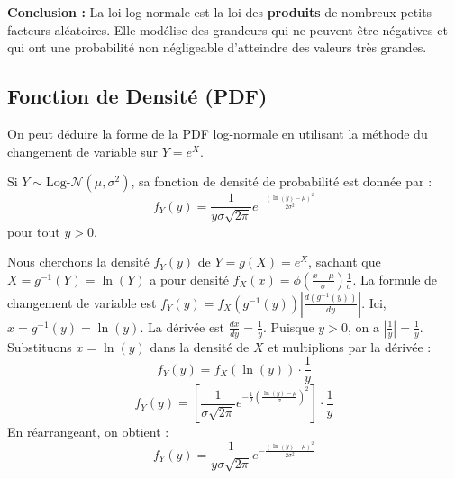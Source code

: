\begin{intuitionbox}
\textbf{Conclusion :} La loi log-normale est la loi des \textbf{produits} de nombreux petits facteurs aléatoires. Elle modélise des grandeurs qui ne peuvent être négatives et qui ont une probabilité non négligeable d'atteindre des valeurs très grandes.
\end{intuitionbox}

\subsection{Fonction de Densité (PDF)}

On peut déduire la forme de la PDF log-normale en utilisant la méthode du changement de variable sur $Y = e^X$.

\begin{theorembox}
Si $Y \sim \text{Log-}\mathcal{N}(\mu, \sigma^2)$, sa fonction de densité de probabilité est donnée par :
$$ f_Y(y) = \frac{1}{y \sigma \sqrt{2\pi}} e^{ -\frac{(\ln(y) - \mu)^2}{2\sigma^2} } $$
pour tout $y > 0$.
\end{theorembox}

\begin{proofbox}
Nous cherchons la densité $f_Y(y)$ de $Y = g(X) = e^X$, sachant que $X = g^{-1}(Y) = \ln(Y)$ a pour densité $f_X(x) = \phi\left(\frac{x-\mu}{\sigma}\right) \frac{1}{\sigma}$.
La formule de changement de variable est $f_Y(y) = f_X(g^{-1}(y)) \left| \frac{d(g^{-1}(y))}{dy} \right|$.
Ici, $x = g^{-1}(y) = \ln(y)$.
La dérivée est $\frac{dx}{dy} = \frac{1}{y}$. Puisque $y > 0$, on a $|\frac{1}{y}| = \frac{1}{y}$.
Substituons $x = \ln(y)$ dans la densité de $X$ et multiplions par la dérivée :
$$ f_Y(y) = f_X(\ln(y)) \cdot \frac{1}{y} $$
$$ f_Y(y) = \left[ \frac{1}{\sigma \sqrt{2\pi}} e^{ -\frac{1}{2} \left( \frac{\ln(y)-\mu}{\sigma} \right)^2 } \right] \cdot \frac{1}{y} $$
En réarrangeant, on obtient :
$$ f_Y(y) = \frac{1}{y \sigma \sqrt{2\pi}} e^{ -\frac{(\ln(y) - \mu)^2}{2\sigma^2} } $$
\end{proofbox}

